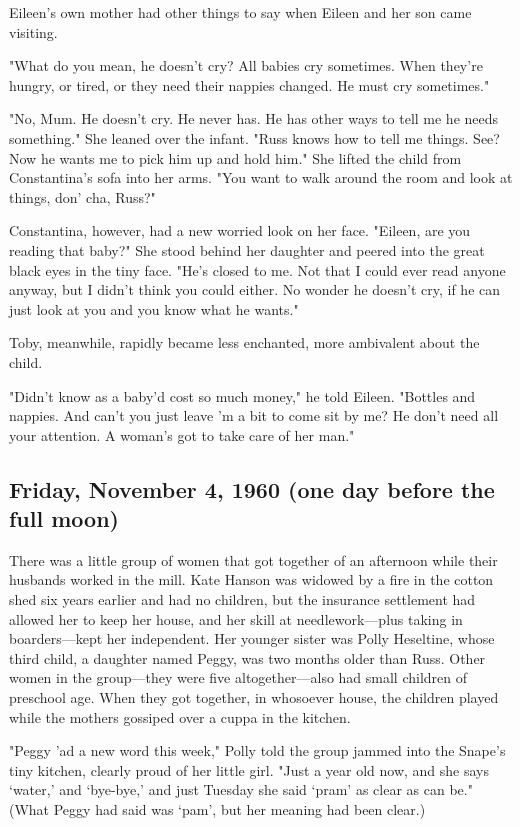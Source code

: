 Eileen's own mother had other things to say when Eileen and her son came visiting.

"What do you mean, he doesn't cry? All babies cry sometimes. When they're hungry, or tired, or they need their nappies changed. He must cry sometimes."

"No, Mum. He doesn't cry. He never has. He has other ways to tell me he needs something." She leaned over the infant. "Russ knows how to tell me things. See? Now he wants me to pick him up and hold him." She lifted the child from Constantina's sofa into her arms. "You want to walk around the room and look at things, don' cha, Russ?"

Constantina, however, had a new worried look on her face. "Eileen, are you reading that baby?" She stood behind her daughter and peered into the great black eyes in the tiny face. "He's closed to me. Not that I could ever read anyone anyway, but I didn't think you could either. No wonder he doesn't cry, if he can just look at you and you know what he wants."

Toby, meanwhile, rapidly became less enchanted, more ambivalent about the child.

"Didn't know as a baby'd cost so much money," he told Eileen. "Bottles and nappies. And can't you just leave 'm a bit to come sit by me? He don't need all your attention. A woman's got to take care of her man."

\subsection{Friday, November 4, 1960 (one day before the full moon)}

There was a little group of women that got together of an afternoon while their husbands worked in the mill. Kate Hanson was widowed by a fire in the cotton shed six years earlier and had no children, but the insurance settlement had allowed her to keep her house, and her skill at needlework—plus taking in boarders—kept her independent. Her younger sister was Polly Heseltine, whose third child, a daughter named Peggy, was two months older than Russ. Other women in the group—they were five altogether—also had small children of preschool age. When they got together, in whosoever house, the children played while the mothers gossiped over a cuppa in the kitchen.

"Peggy 'ad a new word this week," Polly told the group jammed into the Snape's tiny kitchen, clearly proud of her little girl. "Just a year old now, and she says `water,' and `bye-bye,' and just Tuesday she said `pram' as clear as can be." (What Peggy had said was `pam', but her meaning had been clear.)

